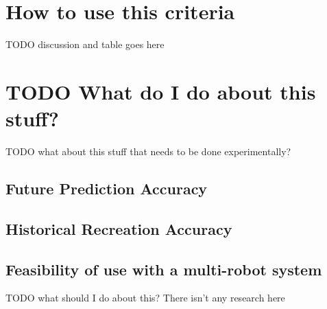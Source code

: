   \section{ How to use this criteria }
  TODO discussion and table goes here


  \section{ TODO What do I do about this stuff? }

  TODO what about this stuff that needs to be done experimentally?
  \subsection{ Future Prediction Accuracy }
  \subsection{ Historical Recreation Accuracy }

  \subsection{ Feasibility of use with a multi-robot system }
  TODO what should I do about this? There isn't any research here





